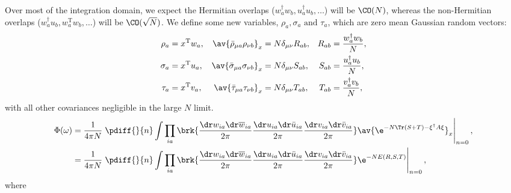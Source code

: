 \documentclass[12pt]{article}
\newcommand{\dg}{^\dagger}
\newcommand{\trans}{^\mathrm{T}}
\newcommand{\dw}{\dr w}
\newcommand{\dwb}{\dr\overline{w}}
\newcommand{\du}{\dr u}
\newcommand{\dub}{\dr\bar{u}}
\newcommand{\dv}{\dr v}
\newcommand{\dvb}{\dr\bar{v}}
\begin{document}
Over most of the integration domain, we expect the Hermitian overlaps ($w_a\dg w_b, u_a\dg u_b,\ldots$) will be $\CO(N)$, whereas the non-Hermitian overlaps ($w_a\dg u_b, w_a\trans w_b,\ldots$) will be $\CO(\sqrt{N})$.
We define some new variables, $\rho_a,\sigma_a \text{ and } \tau_a$, which are zero mean Gaussian random vectors:
%
\begin{equation}\label{eq:reprstdef}
\begin{aligned}
  \rho_a &= x\trans w_a ,
    & \av{\bar{\rho}_{\mu a} \rho_{\nu b}}_x &= N\delta_{\mu\nu}R_{ab} ,
    & R_{ab}&=\frac{w_a\dg w_b}{N}, \\
  \sigma_a &= x\trans u_a ,
    & \av{\bar{\sigma}_{\mu a} \sigma_{\nu b}}_x &= N\delta_{\mu\nu}S_{ab} ,
    & S_{ab}&=\frac{u_a\dg u_b}{N}, \\
  \tau_a &= x\trans v_a,
    & \av{\bar{\tau}_{\mu a} \tau_{\nu b}}_x &= N\delta_{\mu\nu}T_{ab},
    & T_{ab}&=\frac{v_a\dg v_b}{N}, \\
\end{aligned}
\end{equation}
%
with all other covariances negligible in the large $N$ limit.
%
\begin{equation}\label{eq:phirepxi}
    \begin{aligned}
    \Phi(\omega) &= \frac{1}{4\pi N}  \left.\pdiff{}{n}
       \int \prod_{ia}\brk{ \frac{\dw_{ia}\dwb_{ia}}{2\pi} \frac{\du_{ia}\dub_{ia}}{2\pi} \frac{\dv_{ia}\dvb_{ia}}{2\pi} }
       \av{\e^{-N\Tr(S+T) - \xi\dg A \xi}}_x
       \right\rvert_{n=0}, \\
     &= \frac{1}{4\pi N}  \left.\pdiff{}{n}
       \int \prod_{ia}\brk{ \frac{\dw_{ia}\dwb_{ia}}{2\pi} \frac{\du_{ia}\dub_{ia}}{2\pi} \frac{\dv_{ia}\dvb_{ia}}{2\pi} }
       \e^{-NE(R,S,T)}
       \right\rvert_{n=0}, 
\end{aligned}
\end{equation}
%
where
%
\end{document}
